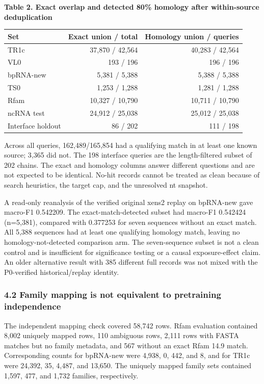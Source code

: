 \documentclass[
  11pt]{article}
\begin{document}
\textbf{Table 2. Exact overlap and detected 80\% homology after
within-source deduplication}

\begin{longtable}[]{@{}lrr@{}}
\toprule
Set & Exact union / total & Homology union / queries \\
\midrule
\endhead
TR1c & 37,870 / 42,564 & 40,283 / 42,564 \\
VL0 & 193 / 196 & 196 / 196 \\
bpRNA-new & 5,381 / 5,388 & 5,388 / 5,388 \\
TS0 & 1,253 / 1,288 & 1,281 / 1,288 \\
Rfam & 10,327 / 10,790 & 10,711 / 10,790 \\
ncRNA test & 24,912 / 25,038 & 25,012 / 25,038 \\
Interface holdout & 86 / 202 & 111 / 198 \\
\bottomrule
\end{longtable}

Across all queries, 162,489/165,854 had a qualifying match in at least
one known source; 3,365 did not. The 198 interface queries are the
length-filtered subset of 202 chains. The exact and homology columns
answer different questions and are not expected to be identical. No-hit
records cannot be treated as clean because of search heuristics, the
target cap, and the unresolved nt snapshot.

A read-only reanalysis of the verified original xens2 replay on
bpRNA-new gave macro-F1 0.542209. The exact-match-detected subset had
macro-F1 0.542424 (n=5,381), compared with 0.377253 for seven sequences
without an exact match. All 5,388 sequences had at least one qualifying
homology match, leaving no homology-not-detected comparison arm. The
seven-sequence subset is not a clean control and is insufficient for
significance testing or a causal exposure-effect claim. An older
alternative result with 385 different full records was not mixed with
the P0-verified historical/replay identity.

\hypertarget{42-family-mapping-is-not-equivalent-to-pretraining-independence}{%
\subsubsection{4.2 Family mapping is not equivalent to pretraining
independence}\label{42-family-mapping-is-not-equivalent-to-pretraining-independence}}

The independent mapping check covered 58,742 rows. Rfam evaluation
contained 8,002 uniquely mapped rows, 110 ambiguous rows, 2,111 rows
with FASTA matches but no family metadata, and 567 without an exact Rfam
14.9 match. Corresponding counts for bpRNA-new were 4,938, 0, 442, and
8, and for TR1c were 24,392, 35, 4,487, and 13,650. The uniquely mapped
family sets contained 1,597, 477, and 1,732 families, respectively.
\end{document}
